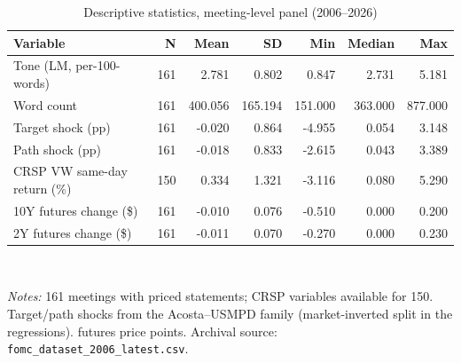 \begin{table}[!tbp]
\centering\small
\caption{Descriptive statistics, meeting-level panel (2006--2026)}
\label{tab:b1}
\begin{tabular}{lrrrrrr}
\toprule
Variable & N & Mean & SD & Min & Median & Max \\
\midrule
Tone (LM, per-100-words) & 161 & 2.781 & 0.802 & 0.847 & 2.731 & 5.181 \\
Word count & 161 & 400.056 & 165.194 & 151.000 & 363.000 & 877.000 \\
Target shock (pp) & 161 & -0.020 & 0.864 & -4.955 & 0.054 & 3.148 \\
Path shock (pp) & 161 & -0.018 & 0.833 & -2.615 & 0.043 & 3.389 \\
CRSP VW same-day return (\%) & 150 & 0.334 & 1.321 & -3.116 & 0.080 & 5.290 \\
10Y futures change (\$) & 161 & -0.010 & 0.076 & -0.510 & 0.000 & 0.200 \\
2Y futures change (\$) & 161 & -0.011 & 0.070 & -0.270 & 0.000 & 0.230 \\
\bottomrule
\end{tabular}
\\[2pt]\begin{minipage}{0.92\linewidth}\footnotesize\emph{Notes:} 161 meetings with priced statements; CRSP variables available for 150. Target/path shocks from the Acosta--USMPD family (market-inverted split in the regressions). futures price points. Archival source: \texttt{fomc\_dataset\_2006\_latest.csv}.\end{minipage}
\end{table}
